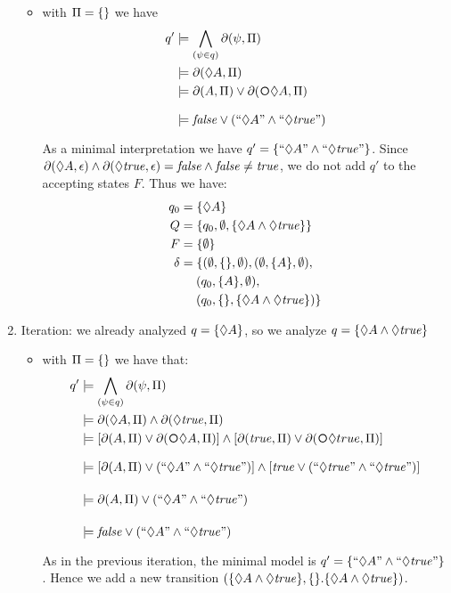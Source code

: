 \begin{example}
\begin{enumerate}
\begin{itemize}
			\item with $\Pi = \{\}$ we have 
			\begin{align*}
			q' &\models \bigwedge_{(\psi\in q)} \Dfun{\psi}\\
			&\models \Dfun{\Diamond A}\\
			&\models \Dfun{A} \lOR \Dfun{\Next \Diamond A}\\
			&\models \false \lOR (``\Diamond A" \lAND ``\Diamond \true")
			\end{align*}
			As a minimal interpretation we have $q' = \{``\Diamond A" \wedge ``\Diamond \mathit{true}"\}$. Since $\partial\lparen \Diamond A, \epsilon\rparen \wedge \partial\lparen \Diamond \mathit{true}, \epsilon\rparen = \mathit{false} \wedge \mathit{false} \neq \mathit{true}$, we do not add $q'$ to the accepting states $F$. Thus we have:
			\begin{align*}
			q_0 &= \{\Diamond A\}		\\
			Q &= \{q_0, \emptyset, \{\Diamond A \wedge \Diamond \mathit{true}\}\}  \\
			F &= \{\emptyset\}  \\
			\delta &= \{(\emptyset, \{\}, \emptyset), (\emptyset, \{A\}, \emptyset),\\
				&\hspace*{.18in} (q_0, \{A\}, \emptyset),\\
				&\hspace*{.18in} (q_0, \{\}, \{\Diamond A \wedge \Diamond \mathit{true}\})\}
			\end{align*}
		\end{itemize}
		
		\item Iteration: we already analyzed $q = \{\Diamond A\}$, so we analyze $q = \{\Diamond A \wedge \Diamond \mathit{true}\}$
		\begin{itemize}			
			\item with $\Pi = \{\}$ we have that:
			\begin{align*}
			q' &\models \bigwedge_{(\psi\in q)} \Dfun{\psi}\\
			&\models \Dfun{\Diamond A} \lAND \Dfun{\Diamond \true}\\
			&\models [\Dfun{A} \lOR \Dfun{\Next \Diamond A}] \lAND [\Dfun{\true} \lOR \Dfun{\Next \Diamond true}]\\
			&\models [\Dfun{A} \lOR ( ``\Diamond A" \lAND ``\Diamond \true")] \lAND [\true \lOR ( ``\Diamond \true" \lAND ``\Diamond \true")]\\
			&\models \Dfun{A} \lOR ( ``\Diamond A" \lAND ``\Diamond \true")\\
			&\models \false \lOR ( ``\Diamond A" \lAND ``\Diamond \true")\\
			\end{align*}
			As in the previous iteration, the minimal model is $q' = \{``\Diamond A" \wedge ``\Diamond \mathit{true}"\}$. Hence we add a new transition $(\{\Diamond A \wedge \Diamond \mathit{true}\}, \{\}. \{\Diamond A \wedge \Diamond \mathit{true}\})$.


\end{itemize}
\end{enumerate}
\end{example}
